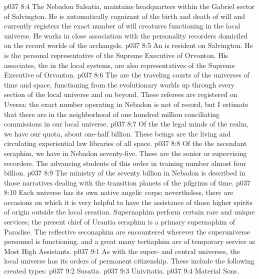 \vs p037 8:4 The Nebadon  Salsatia, maintains headquarters within the Gabriel sector of Salvington. He is automatically cognizant of the birth and death of will and currently registers the exact number of will creatures functioning in the local universe. He works in close association with the personality recorders domiciled on the record worlds of the archangels.
\vs p037 8:5 An  is resident on Salvington. He is the personal representative of the Supreme Executive of Orvonton. His associates, the  in the local systems, are also representatives of the Supreme Executive of Orvonton.
\vs p037 8:6 The  are the traveling courts of the universes of time and space, functioning from the evolutionary worlds up through every section of the local universe and on beyond. These referees are registered on Uversa; the exact number operating in Nebadon is not of record, but I estimate that there are in the neighborhood of one hundred million conciliating commissions in our local universe.
\vs p037 8:7 Of the  the legal minds of the realm, we have our quota, about one\hyp{}half billion. These beings are the living and circulating experiential law libraries of all space.
\vs p037 8:8 Of the  the ascendant seraphim, we have in Nebadon seventy\hyp{}five. These are the senior or supervising recorders. The advancing students of this order in training number almost four billion.
\vs p037 8:9 The ministry of the seventy billion  in Nebadon is described in those narratives dealing with the transition planets of the pilgrims of time.
\pc \vs p037 8:10 Each universe has its own native angelic corps; nevertheless, there are occasions on which it is very helpful to have the assistance of those higher spirits of origin outside the local creation. Supernaphim perform certain rare and unique services; the present chief of Urantia seraphim is a primary supernaphim of Paradise. The reflective seconaphim are encountered wherever the superuniverse personnel is functioning, and a great many tertiaphim are of temporary service as Most High Assistants.
\vs p037 9:1 As with the super\hyp{} and central universes, the local universe has its orders of permanent citizenship. These include the following created types:
\pc \vs p037 9:2 \bibnobreakspace Susatia.
\vs p037 9:3 \bibnobreakspace Univitatia.
\vs p037 9:4 \bibnobreakspace Material Sons.
